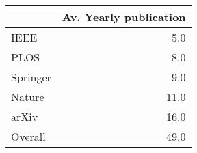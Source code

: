 \begin{tabular}{lr}
\toprule
{} &  Av. Yearly publication \\
\midrule
IEEE     &                     5.0 \\
PLOS     &                     8.0 \\
Springer &                     9.0 \\
Nature   &                    11.0 \\
arXiv    &                    16.0 \\
Overall  &                    49.0 \\
\bottomrule
\end{tabular}
